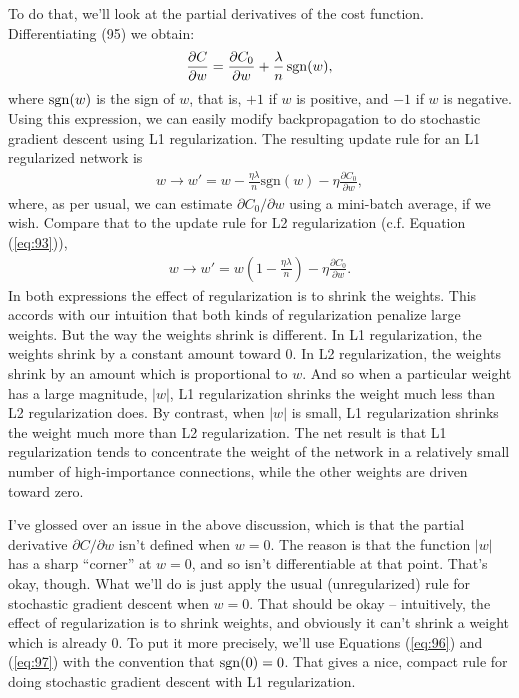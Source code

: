 \documentclass[a4paper,twoside,10pt]{book}
\begin{document}
To do that, we'll look at the partial derivatives of the cost function. Differentiating (95) we obtain:
\begin{eqnarray}
\frac{\partial C}{\partial w} = \frac{\partial C_0}{\partial w} + \frac{\lambda}{n} \, {\rm sgn}(w),\label{eq:96}
\end{eqnarray}
where ${\rm sgn}(w)$ is the sign of $w$, that is, $+1$ if $w$ is positive, and $-1$ if $w$ is negative. Using this expression, we can easily modify backpropagation to do stochastic gradient descent using L1 regularization. The resulting update rule for an L1 regularized network is
\begin{eqnarray}  w \to w' = w-\frac{\eta \lambda}{n} \mbox{sgn}(w) - \eta \frac{\partial C_0}{\partial w}, \label{eq:97}\end{eqnarray}
where, as per usual, we can estimate $\partial{}C_0/\partial{}w$ using a mini-batch average, if we wish. Compare that to the update rule for L2 regularization (c.f. Equation (\ref{eq:93})),
\begin{eqnarray}
w \to w' = w\left(1 - \frac{\eta \lambda}{n} \right) - \eta \frac{\partial C_0}{\partial w}.
\label{eq:98}\end{eqnarray}
In both expressions the effect of regularization is to shrink the weights. This accords with our intuition that both kinds of regularization penalize large weights. But the way the weights shrink is different. In L1 regularization, the weights shrink by a constant amount toward 0. In L2 regularization, the weights shrink by an amount which is proportional to $w$. And so when a particular weight has a large magnitude, $|w|$, L1 regularization shrinks the weight much less than L2 regularization does. By contrast, when $|w|$ is small, L1 regularization shrinks the weight much more than L2 regularization. The net result is that L1 regularization tends to concentrate the weight of the network in a relatively small number of high-importance connections, while the other weights are driven toward zero.

I've glossed over an issue in the above discussion, which is that the partial derivative $\partial{}C/\partial{}w$ isn't defined when $w=0$. The reason is that the function $|w|$ has a sharp ``corner'' at $w=0$, and so isn't differentiable at that point. That's okay, though. What we'll do is just apply the usual (unregularized) rule for stochastic gradient descent when $w=0$. That should be okay -- intuitively, the effect of regularization is to shrink weights, and obviously it can't shrink a weight which is already 0. To put it more precisely, we'll use Equations (\ref{eq:96}) and (\ref{eq:97}) with the convention that ${\rm sgn}(0)=0$. That gives a nice, compact rule for doing stochastic gradient descent with L1 regularization.
\end{document}

